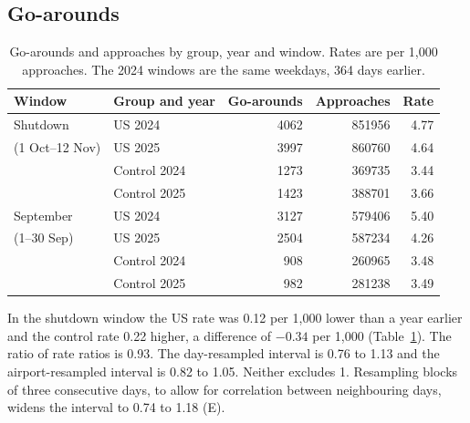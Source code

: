 \documentclass[11pt]{article}
\begin{document}
\subsection{Go-arounds}

\begin{table}[ht]
\centering
\caption{Go-arounds and approaches by group, year and window. Rates are per 1,000 approaches. The 2024 windows are the same weekdays, 364 days earlier. }\label{tab:rates}
\begin{tabular}{llrrr}
\toprule
Window & Group and year & Go-arounds & Approaches & Rate \\
\midrule
Shutdown & US 2024 & \num{4062} & \num{851956} & 4.77 \\
(1 Oct--12 Nov) & US 2025 & \num{3997} & \num{860760} & 4.64 \\
 & Control 2024 & \num{1273} & \num{369735} & 3.44 \\
 & Control 2025 & \num{1423} & \num{388701} & 3.66 \\
\midrule
September & US 2024 & \num{3127} & \num{579406} & 5.40 \\
(1--30 Sep) & US 2025 & \num{2504} & \num{587234} & 4.26 \\
 & Control 2024 & \num{908} & \num{260965} & 3.48 \\
 & Control 2025 & \num{982} & \num{281238} & 3.49 \\
\bottomrule
\end{tabular}
\end{table}

In the shutdown window the US rate was 0.12 per 1,000 lower than a year earlier and the control rate 0.22 higher, a difference of $-0.34$ per 1,000 (Table~\ref{tab:rates}). The ratio of rate ratios is 0.93. The day-resampled interval is 0.76 to 1.13 and the airport-resampled interval is 0.82 to 1.05. Neither excludes 1. Resampling blocks of three consecutive days, to allow for correlation between neighbouring days, widens the interval to 0.74 to 1.18 (E).
\end{document}
